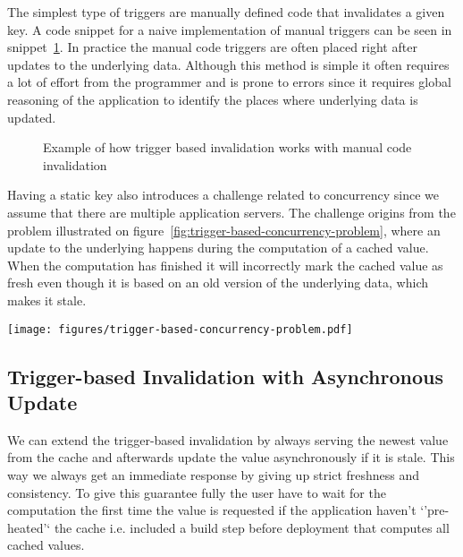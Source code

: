 The simplest type of triggers are manually defined code that invalidates a given key. A code snippet for a naive implementation of manual triggers can be seen in snippet~\ref{code:manual-trigger-invalidation}. In practice the manual code triggers are often placed right after updates to the underlying data. Although this method is simple it often requires a lot of effort from the programmer and is prone to errors since it requires global reasoning of the application to identify the places where underlying data is updated.

\begin{figure}

\caption{Example of how trigger based invalidation works with manual code invalidation}
\label{code:manual-trigger-invalidation}
\end{figure}


Having a static key also introduces a challenge related to concurrency since we assume that there are multiple application servers. The challenge origins from the problem illustrated on figure~\ref{fig:trigger-based-concurrency-problem}, where an update to the underlying happens during the computation of a cached value. When the computation has finished it will incorrectly mark the cached value as fresh even though it is based on an old version of the underlying data, which makes it stale.

\begin{figure*}[ht!]
  \centering
  \texttt{[image: figures/trigger-based-concurrency-problem.pdf]}
  \caption{A scenario of the trigger-based invalidation that results in a race condition, where the cached value are being incorrectly marked as valid even though it is storing a stale value.}
  \label{fig:trigger-based-concurrency-problem}
\end{figure*}


\subsection{Trigger-based Invalidation with Asynchronous Update}
\label{subsec:trigger-based-invalidation-with-asynchronous-update}

We can extend the trigger-based invalidation by always serving the newest value from the cache and afterwards update the value asynchronously if it is stale. This way we always get an immediate response by giving up strict freshness and consistency. To give this guarantee fully the user have to wait for the computation the first time the value is requested if the application haven't `'pre-heated'` the cache i.e. included a build step before deployment that computes all cached values.


